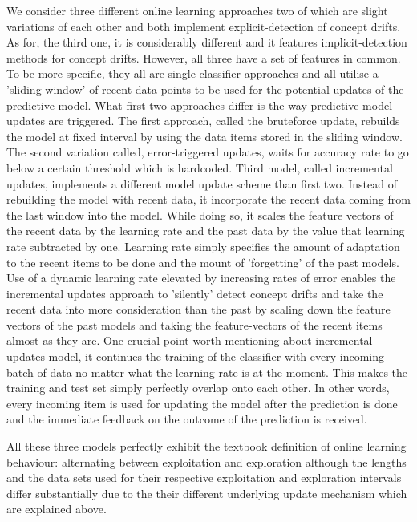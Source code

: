 \documentclass{article} %
\begin{document}
We consider three different online learning approaches two of which are slight variations of each other and both implement explicit-detection of concept drifts. As for, the third one, it is considerably different and it features implicit-detection methods for concept drifts. However, all three have a set of  features in common. To be more specific, they all are single-classifier approaches and all utilise a 'sliding window' of recent data points to be used for the potential updates of the predictive model. What first two approaches differ is the way predictive model updates are triggered. The first approach, called the bruteforce update, rebuilds the model at fixed interval by using the data items stored in the sliding window.\cite[p. 24]{streamingSlides} The second variation called, error-triggered updates, waits for accuracy rate to go below a certain threshold which is hardcoded. Third model, called incremental updates, implements a different model update scheme than first two. Instead of rebuilding the model with recent data, it incorporate the recent data coming from the last window into the model. While doing so, it scales the feature vectors of the recent data by the learning rate and the past data by the value that learning rate subtracted by one. Learning rate simply specifies the amount of adaptation to the recent items to be done and the mount of 'forgetting' of the past models. Use of a dynamic learning rate elevated by increasing rates of error enables the incremental updates approach to 'silently' detect concept drifts and take the recent data into more consideration than the past by scaling down the feature vectors of the past models and taking the feature-vectors of the recent items almost as they are. One crucial point worth mentioning about incremental-updates model, it continues the training of the classifier with every incoming batch of data no matter what the learning rate is at the moment. This makes the training and test set simply perfectly overlap onto each other. In other words, every incoming item is used for updating the model after the prediction is done and the immediate feedback on the outcome of the prediction is received. 

All these three models perfectly exhibit the textbook definition of online learning behaviour: alternating between exploitation and exploration although the lengths and the data sets used for their respective exploitation and exploration intervals differ substantially due to the their different underlying update mechanism which are explained above.
\end{document}
